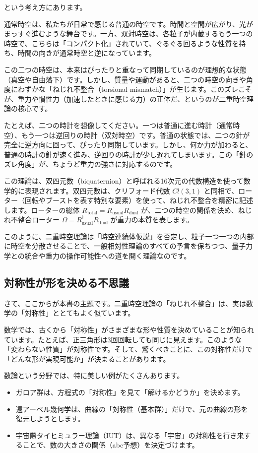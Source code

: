 \documentclass[dvipdfmx,12pt,a4paper]{jsarticle}
\begin{document}
という考え方にあります。

通常時空は、私たちが日常で感じる普通の時空です。時間と空間が広がり、光がまっすぐ進むような舞台です。一方、双対時空は、各粒子が内蔵するもう一つの時空で、こちらは「コンパクト化」されていて、ぐるぐる回るような性質を持ち、時間の向きが通常時空と逆になっています。

この二つの時空は、本来はぴったりと重なって同期しているのが理想的な状態（真空や自由落下）です。しかし、質量や運動があると、二つの時空の向きや角度にわずかな「ねじれ不整合（torsional mismatch）」が生じます。このズレこそが、重力や慣性力（加速したときに感じる力）の正体だ、というのが二重時空理論の核心です。

たとえば、二つの時計を想像してください。一つは普通に進む時計（通常時空）、もう一つは逆回りの時計（双対時空）です。普通の状態では、二つの針が完全に逆方向に回って、ぴったり同期しています。しかし、何か力が加わると、普通の時計の針が速く進み、逆回りの時計が少し遅れてしまいます。この「針のズレ角度」が、ちょうど重力の強さに対応するのです。

この理論は、双四元数（biquaternion）と呼ばれる16次元の代数構造を使って数学的に表現されます。双四元数は、クリフォード代数 $Cl(3,1)$ と同相で、ローター（回転やブーストを表す特別な要素）を使って、ねじれ不整合を精密に記述します。ローターの総体 $R_{\text{total}} = R_{\text{usual}} R_{\text{dual}}$ が、二つの時空の関係を決め、ねじれ不整合ローター $\Omega = R_{\text{usual}}^\dagger R_{\text{dual}}$ が重力の本質を表します。

このように、二重時空理論は「時空連続体仮説」を否定し、粒子一つ一つの内部に時空を分散させることで、一般相対性理論のすべての予言を保ちつつ、量子力学との統合や重力の操作可能性への道を開く理論なのです。

\subsection{対称性が形を決める不思議}

さて、ここからが本書の主題です。二重時空理論の「ねじれ不整合」は、実は数学の「対称性」ととてもよく似ています。

数学では、古くから「対称性」がさまざまな形や性質を決めていることが知られています。たとえば、正三角形は3回回転しても同じに見えます。このような「変わらない性質」が対称性です。そして、驚くべきことに、この対称性だけで「どんな形が実現可能か」が決まることがあります。

数論という分野では、特に美しい例がたくさんあります。

\begin{itemize}
  \item ガロア群は、方程式の「対称性」を見て「解けるかどうか」を決めます。
  \item 遠アーベル幾何学は、曲線の「対称性（基本群）」だけで、元の曲線の形を復元しようとします。
  \item 宇宙際タイヒミュラー理論（IUT）は、異なる「宇宙」の対称性を行き来することで、数の大きさの関係（abc予想）を決定づけます。
\end{itemize}
\end{document}
